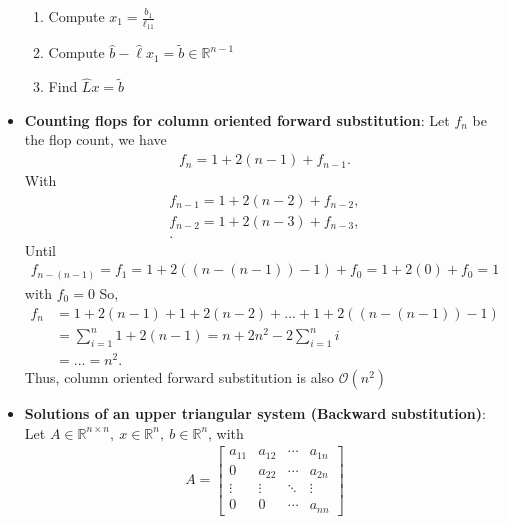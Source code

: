 \documentclass{report}
\begin{document}
\begin{itemize}
            \begin{enumerate}
                \item Compute $x_{1} = \frac{b_{1}}{\ell_{11}} $
                \item Compute $\hat{b} - \hat{\ell}x_{1} = \tilde{b} \in \mathbb{R}^{n-1} $
                \item Find $\hat{L}x = \tilde{b} $
            \end{enumerate}
        \item \textbf{Counting flops for column oriented forward substitution}: Let $f_{n}$ be the flop count, we have
            \begin{align*}
                f_{n} = 1 + 2(n-1) + f_{n-1}
            .\end{align*}
            With
            \begin{align*}
                f_{n-1} = 1 + 2(n-2) + f_{n-2}, \\
                f_{n-2} = 1 + 2(n-3) + f_{n-3}, \\
            .\end{align*}
            Until
            \begin{align*}
                f_{n-(n-1)} = f_{1} = 1 + 2((n-(n-1))-1) + f_{0}  = 1 + 2(0) + f_{0} = 1
            \end{align*}
            with $f_{0} = 0 $
            \bigbreak \noindent 
            So, 
            \begin{align*}
                f_{n} &= 1 + 2(n-1) + 1 + 2(n-2) + ... + 1 + 2((n-(n-1))-1) \\
                &= \sum_{i=1}^{n} 1 + 2(n-1) = n + 2n^{2} - 2\sum_{i=1}^{n}i \\
                &=...=n^{2}
            .\end{align*}
            Thus, column oriented forward substitution is also $\mathcal{O}(n^{2})$
        \item \textbf{Solutions of an upper triangular system (Backward substitution)}: 
            Let $A \in \mathbb{R}^{n\times n},\ x \in \mathbb{R}^{n},\ b \in \mathbb{R}^{n}$, with
            \begin{align*}
                A = \begin{bmatrix}
                    a_{11} & a_{12} & \cdots & a_{1n} \\
                    0 & a_{22} & \cdots & a_{2n} \\
                    \vdots & \vdots & \ddots & \vdots \\
                    0 & 0 & \cdots & a_{nn}

\end{bmatrix}
\end{align*}
\end{itemize}
\end{document}
